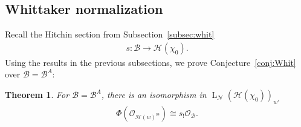 \documentclass[11pt,oneside,a4paper,mathscr]{amsart}
\newtheorem{thm}{Theorem}[section]
\theoremstyle{definition}
\newcommand{\LL}{\operatorname{L}}
\newcommand{\cH}{\mathcal{H}}
\newcommand{\cB}{\mathcal{B}}
\begin{document}
\subsection{Whittaker normalization}
Recall the Hitchin section from Subsection~\ref{subsec:whit}
\begin{align*}
    s \colon \cB \to \cH(\chi_0). 
\end{align*}
Using the results in the previous subsections, we prove Conjecture~\ref{conj:Whit}
over $\cB=\cB^A$: 
\begin{thm}\label{thm:whit}
For $\cB=\cB^A$, there 
is an isomorphism in $\LL_{\mathcal{N}}(\cH(\chi_0))_{w'}$
\begin{align*}
    \Phi(\mathcal{O}_{\cH(w)^{\mathrm{ss}}})
    \cong s_{!}\mathcal{O}_{\cB}.
\end{align*}
\end{thm}
\end{document}

